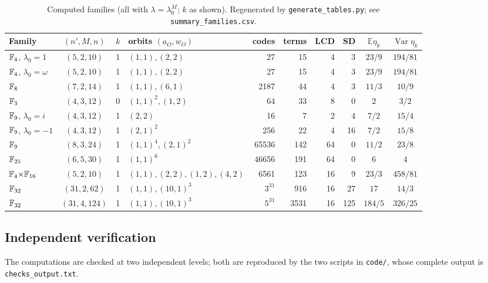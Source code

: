 \begin{table}[!t]
\centering
\scriptsize
\setlength{\tabcolsep}{2.5pt}
\caption{Computed families (all with $\lambda=\lambda_0^M$; $k$ as shown).
Regenerated by \texttt{generate\_tables.py}; see
\texttt{summary\_families.csv}.}
\label{tab:summary}
\begin{tabular}{lcclrrrrcc}
\toprule
Family & $(n',M,n)$ & $k$ & orbits $(a_O,w_O)$ & codes & terms & LCD & SD &
$\mathbb{E}\eta_k$ & $\operatorname{Var}\eta_k$\\
\midrule
$\mathbb F_4$, $\lambda_0{=}1$ & $(5,2,10)$ & 1 & $(1,1),(2,2)$ & 27 & 15 & 4 & 3 & $23/9$ & $194/81$\\
$\mathbb F_4$, $\lambda_0{=}\omega$ & $(5,2,10)$ & 1 & $(1,1),(2,2)$ & 27 & 15 & 4 & 3 & $23/9$ & $194/81$\\
$\mathbb F_8$ & $(7,2,14)$ & 1 & $(1,1),(6,1)$ & 2187 & 44 & 4 & 3 & $11/3$ & $10/9$\\
$\mathbb F_3$ & $(4,3,12)$ & 0 & $(1,1)^2,(1,2)$ & 64 & 33 & 8 & 0 & $2$ & $3/2$\\
$\mathbb F_9$, $\lambda_0{=}i$ & $(4,3,12)$ & 1 & $(2,2)$ & 16 & 7 & 2 & 4 & $7/2$ & $15/4$\\
$\mathbb F_9$, $\lambda_0{=}-1$ & $(4,3,12)$ & 1 & $(2,1)^2$ & 256 & 22 & 4 & 16 & $7/2$ & $15/8$\\
$\mathbb F_9$ & $(8,3,24)$ & 1 & $(1,1)^4,(2,1)^2$ & 65536 & 142 & 64 & 0 & $11/2$ & $23/8$\\
$\mathbb F_{25}$ & $(6,5,30)$ & 1 & $(1,1)^6$ & 46656 & 191 & 64 & 0 & $6$ & $4$\\
$\mathbb F_4{\times}\mathbb F_{16}$ & $(5,2,10)$ & 1 & $(1,1),(2,2),(1,2),(4,2)$ & 6561 & 123 & 16 & 9 & $23/3$ & $458/81$\\
$\mathbb F_{32}$ & $(31,2,62)$ & 1 & $(1,1),(10,1)^3$ & $3^{31}$ & 916 & 16 & 27 & $17$ & $14/3$\\
$\mathbb F_{32}$ & $(31,4,124)$ & 1 & $(1,1),(10,1)^3$ & $5^{31}$ & 3531 & 16 & 125 & $184/5$ & $326/25$\\
\bottomrule
\end{tabular}
\end{table}


\subsection{Independent verification}\label{sec:verification}

The computations are checked at two independent levels; both are reproduced
by the two scripts in \texttt{code/}, whose complete output is
\texttt{checks\_output.txt}.

